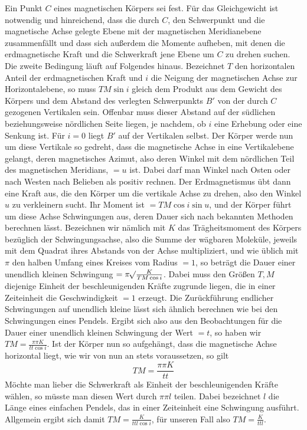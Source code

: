 Ein Punkt $C$ eines magnetischen Körpers sei fest. Für das Gleichgewicht ist notwendig und hinreichend, dass die durch $C$, den Schwerpunkt und die magnetische Achse gelegte Ebene mit der magnetischen Meridianebene zusammenfällt und dass sich außerdem die Momente aufheben, mit denen die erdmagnetische Kraft und die Schwerkraft jene Ebene um $C$ zu drehen suchen. Die zweite Bedingung läuft auf Folgendes hinaus. Bezeichnet $T$ den horizontalen Anteil der erdmagnetischen Kraft und $i$ die Neigung der magnetischen Achse zur Horizontalebene, so muss $TM\sin i$ gleich dem Produkt aus dem Gewicht des Körpers und dem Abstand des verlegten Schwerpunkts $B'$ von der durch $C$ gezogenen Vertikalen sein. Offenbar muss dieser Abstand auf der südlichen beziehungsweise nördlichen Seite liegen, je nachdem, ob $i$ eine Erhebung oder eine Senkung ist. Für $i=0$ liegt $B'$ auf der Vertikalen selbst. Der Körper werde nun um diese Vertikale so gedreht, dass die magnetische Achse in eine Vertikalebene gelangt, deren magnetisches Azimut, also deren Winkel mit dem nördlichen Teil des magnetischen Meridians, $=u$ ist. Dabei darf man Winkel nach Osten oder nach Westen nach Belieben als positiv rechnen. Der Erdmagnetismus übt dann eine Kraft aus, die den Körper um die vertikale Achse zu drehen, also den Winkel $u$ zu verkleinern sucht. Ihr Moment ist $=TM\cos i\sin u$, und der Körper führt um diese Achse Schwingungen aus, deren Dauer sich nach bekannten Methoden berechnen lässt. Bezeichnen wir nämlich mit $K$ das Trägheitsmoment des Körpers bezüglich der Schwingungsachse, also die Summe der wägbaren Moleküle, jeweils mit dem Quadrat ihres Abstands von der Achse multipliziert, und wie üblich mit $\pi$ den halben Umfang eines Kreises vom Radius $=1$, so beträgt die Dauer einer unendlich kleinen Schwingung $=\pi\mathord{{}^{}\!\surd}\frac{K}{TM\cos i}$. Dabei muss den Größen $T,M$ diejenige Einheit der beschleunigenden Kräfte zugrunde liegen, die in einer Zeiteinheit die Geschwindigkeit $=1$ erzeugt. Die Zurückführung endlicher Schwingungen auf unendlich kleine lässt sich ähnlich berechnen wie bei den Schwingungen eines Pendels. Ergibt sich also aus den Beobachtungen für die Dauer einer unendlich kleinen Schwingung der Wert $=t$, so haben wir $TM=\frac{\pi\pi K}{tt\cos i}$. Ist der Körper nun so aufgehängt, dass die magnetische Achse horizontal liegt, wie wir von nun an stets voraussetzen, so gilt
\[
TM=\frac{\pi\pi K}{tt}
\]
Möchte man lieber die Schwerkraft als Einheit der beschleunigenden Kräfte wählen, so müsste man diesen Wert durch $\pi\pi l$ teilen. Dabei bezeichnet $l$ die Länge eines einfachen Pendels, das in einer Zeiteinheit eine Schwingung ausführt. Allgemein ergibt sich damit $TM=\frac{K}{ttl\cos i}$, für unseren Fall also $TM=\frac{K}{ttl}$.
